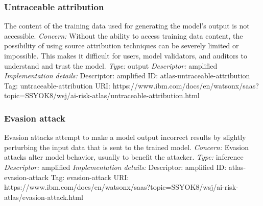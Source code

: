 \documentclass{article}
\begin{document}
\subsubsection*{Untraceable attribution}
The content of the training data used for generating the model's output is not accessible.\newline
\textit{Concern: }Without the ability to access training data content, the possibility of using source attribution techniques can be severely limited or impossible. This makes it difficult for users, model validators, and auditors to understand and trust the model.\newline\newline
\textit{Type: }output\newline
\textit{Descriptor: }amplified \newline\newline
\textit{Implementation details:} \newline
Descriptor: amplified \newline
ID: atlas-untraceable-attribution \newline
Tag: untraceable-attribution \newline
URI:  https://www.ibm.com/docs/en/watsonx/saas?topic=SSYOK8/wsj/ai-risk-atlas/untraceable-attribution.html\newline
\subsubsection*{Evasion attack}
Evasion attacks attempt to make a model output incorrect results by slightly perturbing the input data that is sent to the trained model.\newline
\textit{Concern: }Evasion attacks alter model behavior, usually to benefit the attacker.\newline\newline
\textit{Type: }inference\newline
\textit{Descriptor: }amplified \newline\newline
\textit{Implementation details:} \newline
Descriptor: amplified \newline
ID: atlas-evasion-attack \newline
Tag: evasion-attack \newline
URI:  https://www.ibm.com/docs/en/watsonx/saas?topic=SSYOK8/wsj/ai-risk-atlas/evasion-attack.html\newline
\end{document}
